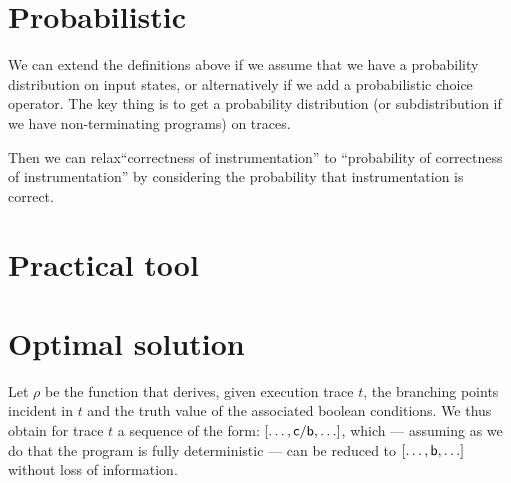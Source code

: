 \documentclass[]{article}
\begin{document}
\section{Probabilistic}

We can extend the definitions above if we assume that we have a
probability distribution on input states, or alternatively if we add a
probabilistic choice operator. The key thing is to get a probability
distribution (or subdistribution if we have non-terminating programs)
on traces.

Then we can relax``correctness of instrumentation'' to ``probability of correctness of
instrumentation'' by considering the probability that instrumentation
is correct. 

\section{Practical tool}

\section{Optimal solution}

Let $\rho$ be the function that derives, given execution trace $t$, the branching points incident in $t$ and the truth value of the associated boolean conditions. We thus obtain for trace $t$ a sequence of the form: $[ \ldots , {\sf c}/{\sf b}, \ldots ]$, which --- assuming as we do that the program is fully deterministic --- can be reduced to $[ \ldots, {\sf b}, \ldots]$ without loss of information.
\end{document}
